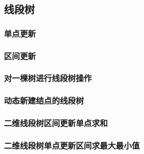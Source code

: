 \subsection{线段树}
\subsubsection{单点更新}


\subsubsection{区间更新}


\subsubsection{对一棵树进行线段树操作}


\subsubsection{动态新建结点的线段树}


\subsubsection{二维线段树区间更新单点求和}


\subsubsection{二维线段树单点更新区间求最大最小值}




